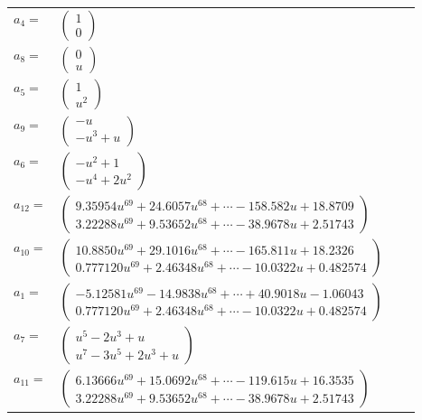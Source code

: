 \documentclass[1p]{elsarticle_modified}
\theoremstyle{definition}
\begin{document}
\begin{tabular}{m{7pt} m{180pt} m{7pt} m{180pt} }
\flushright $a_{4}=$&$\begin{pmatrix}1\\0\end{pmatrix}$ \\
\flushright $a_{8}=$&$\begin{pmatrix}0\\u\end{pmatrix}$ \\
\flushright $a_{5}=$&$\begin{pmatrix}1\\u^2\end{pmatrix}$ \\
\flushright $a_{9}=$&$\begin{pmatrix}- u\\- u^3+u\end{pmatrix}$ \\
\flushright $a_{6}=$&$\begin{pmatrix}- u^2+1\\- u^4+2 u^2\end{pmatrix}$ \\
\flushright $a_{12}=$&$\begin{pmatrix}9.35954 u^{69}+24.6057 u^{68}+\cdots-158.582 u+18.8709\\3.22288 u^{69}+9.53652 u^{68}+\cdots-38.9678 u+2.51743\end{pmatrix}$ \\
\flushright $a_{10}=$&$\begin{pmatrix}10.8850 u^{69}+29.1016 u^{68}+\cdots-165.811 u+18.2326\\0.777120 u^{69}+2.46348 u^{68}+\cdots-10.0322 u+0.482574\end{pmatrix}$ \\
\flushright $a_{1}=$&$\begin{pmatrix}-5.12581 u^{69}-14.9838 u^{68}+\cdots+40.9018 u-1.06043\\0.777120 u^{69}+2.46348 u^{68}+\cdots-10.0322 u+0.482574\end{pmatrix}$ \\
\flushright $a_{7}=$&$\begin{pmatrix}u^5-2 u^3+u\\u^7-3 u^5+2 u^3+u\end{pmatrix}$ \\
\flushright $a_{11}=$&$\begin{pmatrix}6.13666 u^{69}+15.0692 u^{68}+\cdots-119.615 u+16.3535\\3.22288 u^{69}+9.53652 u^{68}+\cdots-38.9678 u+2.51743\end{pmatrix}$ \\

\end{tabular}
\end{document}
